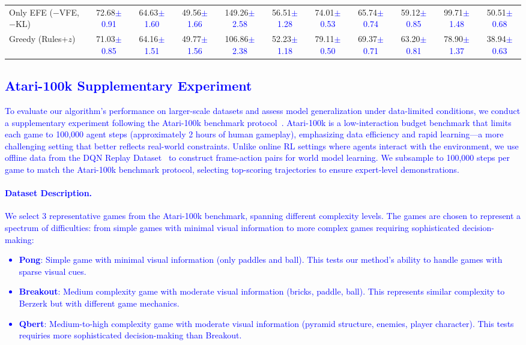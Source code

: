 \documentclass{article} %
\newcommand{\revise}[1]{\textcolor{blue}{#1}}
\begin{document}
\begin{table}[!t]
{\begin{tabular}{lccccc|ccccc}
Only EFE ($-$VFE,$-$KL) & 72.68\revise{${\pm}$\tiny{0.91}} & 64.63\revise{${\pm}$\tiny{1.60}} & 49.56\revise{${\pm}$\tiny{1.66}} & 149.26\revise{${\pm}$\tiny{2.58}} & 56.51\revise{${\pm}$\tiny{1.28}} &
74.01\revise{${\pm}$\tiny{0.53}} & 65.74\revise{${\pm}$\tiny{0.74}} & 59.12\revise{${\pm}$\tiny{0.85}} & 99.71\revise{${\pm}$\tiny{1.48}} & 50.51\revise{${\pm}$\tiny{0.68}} \\
Greedy (Rules+$z$) & 71.03\revise{${\pm}$\tiny{0.85}} & 64.16\revise{${\pm}$\tiny{1.51}} & 49.77\revise{${\pm}$\tiny{1.56}} & 106.86\revise{${\pm}$\tiny{2.38}} & 52.23\revise{${\pm}$\tiny{1.18}} &
79.11\revise{${\pm}$\tiny{0.50}} & 69.37\revise{${\pm}$\tiny{0.71}} & 63.20\revise{${\pm}$\tiny{0.81}} & 78.90\revise{${\pm}$\tiny{1.37}} & 38.94\revise{${\pm}$\tiny{0.63}} \\
\bottomrule
\end{tabular}}
\end{table}
\revise{\subsection{Atari-100k Supplementary Experiment}
\label{Sec:C6}
To evaluate our algorithm's performance on larger-scale datasets and assess model generalization under data-limited conditions, we conduct a supplementary experiment following the Atari-100k benchmark protocol~\citep{kaiser2019modelbased}. Atari-100k is a low-interaction budget benchmark that limits each game to 100,000 agent steps (approximately 2 hours of human gameplay), emphasizing data efficiency and rapid learning---a more challenging setting that better reflects real-world constraints. Unlike online RL settings where agents interact with the environment, we use offline data from the DQN Replay Dataset~\citep{agarwal2020offline} to construct frame-action pairs for world model learning. We subsample to 100,000 steps per game to match the Atari-100k benchmark protocol, selecting top-scoring trajectories to ensure expert-level demonstrations.}
\revise{\paragraph{Dataset Description.}
We select 3 representative games from the Atari-100k benchmark, spanning different complexity levels. The games are chosen to represent a spectrum of difficulties: from simple games with minimal visual information to more complex games requiring sophisticated decision-making:}
\revise{\begin{itemize}
    \item \textbf{Pong}: Simple game with minimal visual information (only paddles and ball). This tests our method's ability to handle games with sparse visual cues.
    \item \textbf{Breakout}: Medium complexity game with moderate visual information (bricks, paddle, ball). This represents similar complexity to Berzerk but with different game mechanics.
    \item \textbf{Qbert}: Medium-to-high complexity game with moderate visual information (pyramid structure, enemies, player character). This tests requiries more sophisticated decision-making than Breakout.
\end{itemize}}
\end{document}
